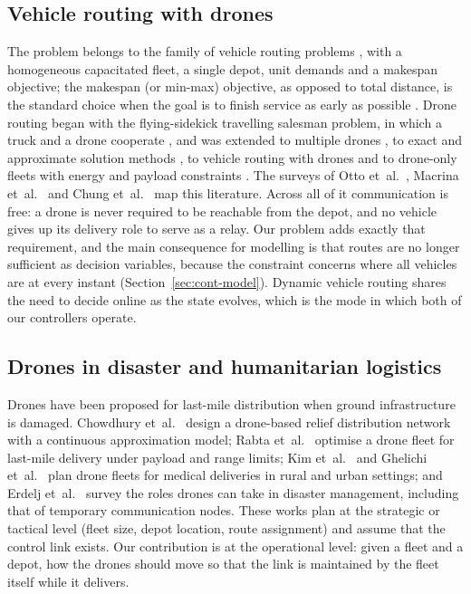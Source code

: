 \documentclass[final,5p,times,twocolumn]{elsarticle}
\begin{document}
\subsection{Vehicle routing with drones}
\label{sec:rel-vrp}
The problem belongs to the family of vehicle routing problems \cite{dantzig1959,toth2014}, with
a homogeneous capacitated fleet, a single depot, unit demands and a makespan objective; the
makespan (or min-max) objective, as opposed to total distance, is the standard choice when the
goal is to finish service as early as possible \cite{park2023,kitjacharoenchai2019}. Drone
routing began with the flying-sidekick travelling salesman problem, in which a truck and a drone
cooperate \cite{murray2015}, and was extended to multiple drones \cite{murray2020}, to exact and
approximate solution methods \cite{agatz2018,ha2018,roberti2021,dell2021}, to vehicle routing
with drones \cite{poikonen2017,sacramento2019,schermer2019} and to drone-only fleets with
energy and payload constraints \cite{dorling2017}. The surveys of Otto et~al.\ \cite{otto2018},
Macrina et~al.\ \cite{macrina2020} and Chung et~al.\ \cite{chung2020} map this literature.
Across all of it communication is free: a drone is never required to be reachable from the
depot, and no vehicle gives up its delivery role to serve as a relay. Our problem adds exactly
that requirement, and the main consequence for modelling is that routes are no longer sufficient
as decision variables, because the constraint concerns where all vehicles are at every instant
(Section~\ref{sec:cont-model}). Dynamic vehicle routing \cite{pillac2013} shares the need to
decide online as the state evolves, which is the mode in which both of our controllers operate.

\subsection{Drones in disaster and humanitarian logistics}
\label{sec:rel-disaster}
Drones have been proposed for last-mile distribution when ground infrastructure is damaged.
Chowdhury et~al.\ \cite{chowdhury2017} design a drone-based relief distribution network with a
continuous approximation model; Rabta et~al.\ \cite{rabta2018} optimise a drone fleet for
last-mile delivery under payload and range limits; Kim et~al.\ \cite{kim2017} and Ghelichi et~al.\
\cite{ghelichi2021} plan drone fleets for medical deliveries in rural and urban settings; and
Erdelj et~al.\ \cite{erdelj2017} survey the roles drones can take in disaster management,
including that of temporary communication nodes. These works plan at the strategic or tactical
level (fleet size, depot location, route assignment) and assume that the control link exists.
Our contribution is at the operational level: given a fleet and a depot, how the drones should
move so that the link is maintained by the fleet itself while it delivers.
\end{document}
